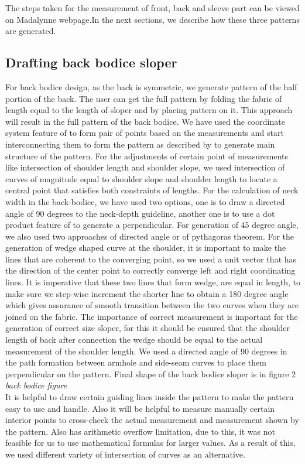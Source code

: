 \documentclass[10pt,letterpaper]{ltugboat}
\begin{document}
The steps taken for the measurement of front, back and sleeve part can be viewed on Madalynne webpage\cite{maddie}.In the next sections, we describe how these three patterns are generated.
\subsection{Drafting back bodice sloper}
For back bodice design, as the back is symmetric, we generate pattern of the half portion of the back. The user can get the full pattern by folding the fabric of length equal to the length of sloper and by placing pattern on it. This approach will result in the full pattern of the back bodice. We have used the coordinate system feature of \MP{} to form pair of points based on the measurements and start interconnecting them to form the pattern as described by \cite{maddie} to generate main structure of the pattern. For the adjustments of certain point of measurements like intersection of shoulder length and shoulder slope, we used intersection of curves of magnitude equal to shoulder slope and shoulder length to locate a central point that satisfies both constraints of lengths. For the calculation of neck width in the back-bodice, we have used two options, one is to draw a directed angle of 90 degrees to the neck-depth guideline, another one is to use a dot product feature of \MP{} to generate a perpendicular. For generation of 45 degree angle, we also used two approaches of directed angle or of pythagoras theorem. For the generation of wedge shaped curve at the shoulder, it is important to make the lines that are coherent to the converging point, so we used a unit vector that has the direction of the center point to correctly converge left and right coordinating lines. It is imperative that these two lines that form wedge, are equal in length, to make sure we step-wise increment the shorter line to obtain a 180 degree angle which gives assurance of smooth transition between the two curves when they are joined on the fabric. The importance of correct measurement is important for the generation of correct size sloper, for this it should be ensured that the shoulder length of back after connection the wedge should be equal to the actual measurement of the shoulder length. We used a directed angle of 90 degrees in the path formation between armhole and side-seam curves to place them perpendicular on the pattern. Final shape of the back bodice sloper is in figure 2 \textit{back bodice figure}
\\It is helpful to draw certain guiding lines inside the pattern to make the pattern easy to use and handle. Also it will be helpful to measure manually certain interior points to cross-check the actual measurement and measurement shown by the pattern. Also \MP{} has arithmetic overflow limitation, due to this, it was not feasible for us to use mathematical formulas for larger values. As a result of this, we used different variety of intersection of curves as an alternative.
\end{document}

